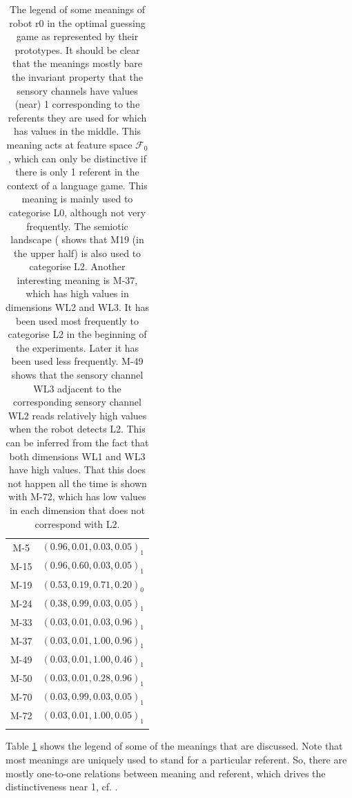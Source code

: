 \begin{table}
\centering
\begin{tabular}{cc}
\lsptoprule
M-5 & $(0.96,0.01,0.03,0.05)_1$\\%
M-15 & $(0.96,0.60,0.03,0.05)_1$\\%
M-19 & $(0.53,0.19,0.71,0.20)_0$\\%
M-24 & $(0.38,0.99,0.03,0.05)_1$\\%
M-33 & $(0.03,0.01,0.03,0.96)_1$\\%
M-37 & $(0.03,0.01,1.00,0.96)_1$\\%
M-49 & $(0.03,0.01,1.00,0.46)_1$\\%
M-50 & $(0.03,0.01,0.28,0.96)_1$\\%
M-70 & $(0.03,0.99,0.03,0.05)_1$\\%
M-72 & $(0.03,0.01,1.00,0.05)_1$\\%
\lspbottomrule
\end{tabular}
\caption{The legend of some meanings of robot r0 in the optimal guessing game as represented by their prototypes. It should be clear that the meanings mostly bare the invariant property that the sensory channels have values (near) 1 corresponding to the referents they are used for which has values in the middle. This meaning acts at feature space ${\mathcal F}_0$, which can only be distinctive if there is only 1 referent in the context of a language game. This meaning is mainly used to categorise L0, although not very frequently. The semiotic landscape ( shows that M19 (in the upper half) is also used to categorise L2. Another interesting meaning is M-37, which has high values in dimensions WL2 and WL3. It has been used most frequently to categorise L2 in the beginning of the experiments. Later it has been used less frequently. M-49 shows that the sensory channel WL3 adjacent to the corresponding sensory channel WL2 reads relatively high values when the robot detects L2. This can be inferred from the fact that both dimensions WL1 and WL3 have high values. That this does not happen all the time is shown with M-72, which has low values in each dimension that does not correspond with L2.}
\label{t:opt:legend}
\end{table}

Table \ref{t:opt:legend} shows the legend of some of the meanings that are discussed. Note that most meanings are uniquely used to stand for a particular referent. So, there are mostly one-to-one relations between meaning and referent, which drives the distinctiveness near 1, cf. .

